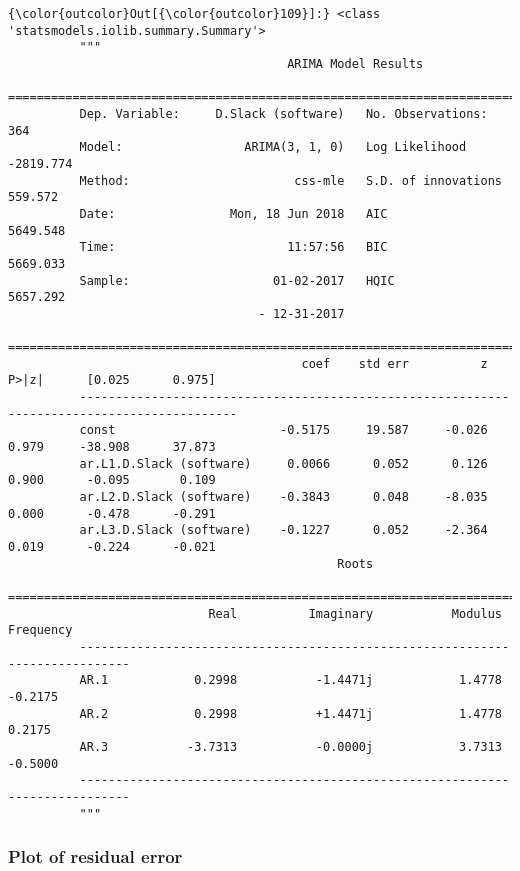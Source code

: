 \documentclass[11pt]{article}
\begin{document}
\begin{Verbatim}[commandchars=\\\{\}]
{\color{outcolor}Out[{\color{outcolor}109}]:} <class 'statsmodels.iolib.summary.Summary'>
          """
                                       ARIMA Model Results                              
          ==============================================================================
          Dep. Variable:     D.Slack (software)   No. Observations:                  364
          Model:                 ARIMA(3, 1, 0)   Log Likelihood               -2819.774
          Method:                       css-mle   S.D. of innovations            559.572
          Date:                Mon, 18 Jun 2018   AIC                           5649.548
          Time:                        11:57:56   BIC                           5669.033
          Sample:                    01-02-2017   HQIC                          5657.292
                                   - 12-31-2017                                         
          ============================================================================================
                                         coef    std err          z      P>|z|      [0.025      0.975]
          --------------------------------------------------------------------------------------------
          const                       -0.5175     19.587     -0.026      0.979     -38.908      37.873
          ar.L1.D.Slack (software)     0.0066      0.052      0.126      0.900      -0.095       0.109
          ar.L2.D.Slack (software)    -0.3843      0.048     -8.035      0.000      -0.478      -0.291
          ar.L3.D.Slack (software)    -0.1227      0.052     -2.364      0.019      -0.224      -0.021
                                              Roots                                    
          =============================================================================
                            Real          Imaginary           Modulus         Frequency
          -----------------------------------------------------------------------------
          AR.1            0.2998           -1.4471j            1.4778           -0.2175
          AR.2            0.2998           +1.4471j            1.4778            0.2175
          AR.3           -3.7313           -0.0000j            3.7313           -0.5000
          -----------------------------------------------------------------------------
          """
\end{Verbatim}
            
    \subsubsection{Plot of residual error}\label{plot-of-residual-error}
\end{document}
